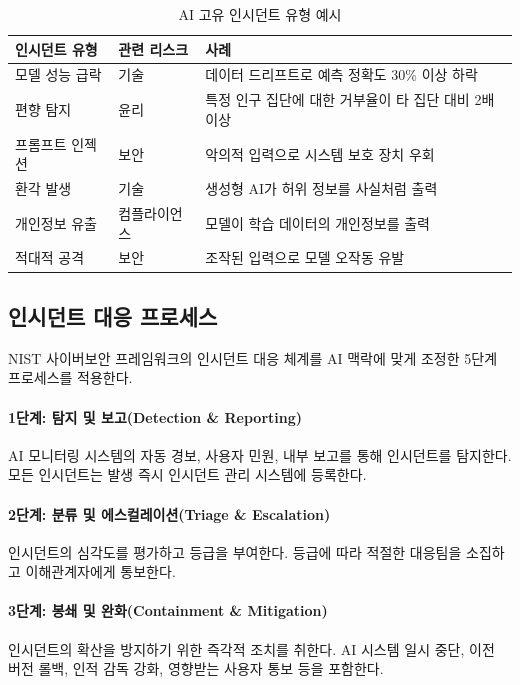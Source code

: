 \begin{table}[htbp]
\centering
\caption{AI 고유 인시던트 유형 예시}
\label{tab:ai_incident_types}
\begin{tabularx}{\textwidth}{p{3cm}p{2cm}X}
\toprule
\textbf{인시던트 유형} & \textbf{관련 리스크} & \textbf{사례} \\
\midrule
모델 성능 급락 & 기술 & 데이터 드리프트로 예측 정확도 30\% 이상 하락 \\
편향 탐지 & 윤리 & 특정 인구 집단에 대한 거부율이 타 집단 대비 2배 이상 \\
프롬프트 인젝션 & 보안 & 악의적 입력으로 시스템 보호 장치 우회 \\
환각 발생 & 기술 & 생성형 AI가 허위 정보를 사실처럼 출력 \\
개인정보 유출 & 컴플라이언스 & 모델이 학습 데이터의 개인정보를 출력 \\
적대적 공격 & 보안 & 조작된 입력으로 모델 오작동 유발 \\
\bottomrule
\end{tabularx}
\end{table}

\subsection{인시던트 대응 프로세스}
\label{sec:5.6.2}

NIST 사이버보안 프레임워크의 인시던트 대응 체계를 AI 맥락에 맞게 조정한 5단계 프로세스를 적용한다.

\paragraph{1단계: 탐지 및 보고(Detection \& Reporting)}
AI 모니터링 시스템의 자동 경보, 사용자 민원, 내부 보고를 통해 인시던트를 탐지한다. 모든 인시던트는 발생 즉시 인시던트 관리 시스템에 등록한다.

\paragraph{2단계: 분류 및 에스컬레이션(Triage \& Escalation)}
인시던트의 심각도를 평가하고 등급을 부여한다. 등급에 따라 적절한 대응팀을 소집하고 이해관계자에게 통보한다.

\paragraph{3단계: 봉쇄 및 완화(Containment \& Mitigation)}
인시던트의 확산을 방지하기 위한 즉각적 조치를 취한다. AI 시스템 일시 중단, 이전 버전 롤백, 인적 감독 강화, 영향받는 사용자 통보 등을 포함한다.

